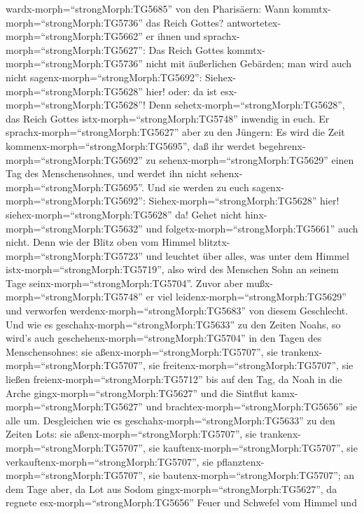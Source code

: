 wardx-morph=``strongMorph:TG5685'' von den Pharisäern: Wann
kommtx-morph=``strongMorph:TG5736'' das Reich Gottes?
antwortetex-morph=``strongMorph:TG5662'' er ihnen und
sprachx-morph=``strongMorph:TG5627'': Das Reich Gottes
kommtx-morph=``strongMorph:TG5736'' nicht mit äußerlichen Gebärden;
 man wird auch nicht sagenx-morph=``strongMorph:TG5692'':
Siehex-morph=``strongMorph:TG5628'' hier! oder: da ist
esx-morph=``strongMorph:TG5628''! Denn
sehetx-morph=``strongMorph:TG5628'', das Reich Gottes
istx-morph=``strongMorph:TG5748'' inwendig in euch.  Er
sprachx-morph=``strongMorph:TG5627'' aber zu den Jüngern: Es wird die
Zeit kommenx-morph=``strongMorph:TG5695'', daß ihr werdet
begehrenx-morph=``strongMorph:TG5692'' zu
sehenx-morph=``strongMorph:TG5629'' einen Tag des Menschensohnes, und
werdet ihn nicht sehenx-morph=``strongMorph:TG5695''.  Und
sie werden zu euch sagenx-morph=``strongMorph:TG5692'':
Siehex-morph=``strongMorph:TG5628'' hier!
siehex-morph=``strongMorph:TG5628'' da! Gehet nicht
hinx-morph=``strongMorph:TG5632'' und
folgetx-morph=``strongMorph:TG5661'' auch nicht.  Denn wie
der Blitz oben vom Himmel blitztx-morph=``strongMorph:TG5723'' und
leuchtet über alles, was unter dem Himmel
istx-morph=``strongMorph:TG5719'', also wird des Menschen Sohn an seinem
Tage seinx-morph=``strongMorph:TG5704''.  Zuvor aber
mußx-morph=``strongMorph:TG5748'' er viel
leidenx-morph=``strongMorph:TG5629'' und verworfen
werdenx-morph=``strongMorph:TG5683'' von diesem Geschlecht.
 Und wie es geschahx-morph=``strongMorph:TG5633'' zu den
Zeiten Noahs, so wird's auch geschehenx-morph=``strongMorph:TG5704'' in
den Tagen des Menschensohnes:  sie
aßenx-morph=``strongMorph:TG5707'', sie
trankenx-morph=``strongMorph:TG5707'', sie
freitenx-morph=``strongMorph:TG5707'', sie ließen
freienx-morph=``strongMorph:TG5712'' bis auf den Tag, da Noah in die
Arche gingx-morph=``strongMorph:TG5627'' und die Sintflut
kamx-morph=``strongMorph:TG5627'' und
brachtex-morph=``strongMorph:TG5656'' sie alle um. 
Desgleichen wie es geschahx-morph=``strongMorph:TG5633'' zu den Zeiten
Lots: sie aßenx-morph=``strongMorph:TG5707'', sie
trankenx-morph=``strongMorph:TG5707'', sie
kauftenx-morph=``strongMorph:TG5707'', sie
verkauftenx-morph=``strongMorph:TG5707'', sie
pflanztenx-morph=``strongMorph:TG5707'', sie
bautenx-morph=``strongMorph:TG5707'';  an dem Tage aber, da
Lot aus Sodom gingx-morph=``strongMorph:TG5627'', da regnete
esx-morph=``strongMorph:TG5656'' Feuer und Schwefel vom Himmel und
